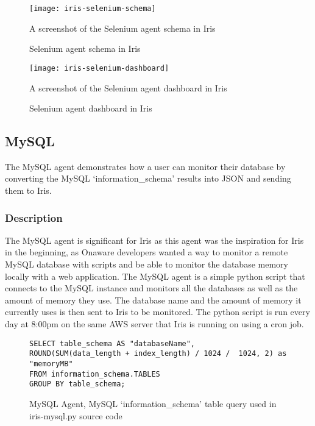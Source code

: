 \documentclass[12pt,a4paper,titlepage]{report}
\begin{document}
\begin{figure}[H]
\begin{tcolorbox}
\begin{center}
\texttt{[image: iris-selenium-schema]}
\end{center}
A screenshot of the Selenium agent schema in Iris
\end{tcolorbox}
\caption{Selenium agent schema in Iris}
\end{figure}

\begin{figure}[H]
\begin{tcolorbox}
\begin{center}
\texttt{[image: iris-selenium-dashboard]}
\end{center}
A screenshot of the Selenium agent dashboard in Iris
\end{tcolorbox}
\caption{Selenium agent dashboard in Iris}
\end{figure}

\subsection{MySQL}
The MySQL agent demonstrates how a user can monitor their database by converting the MySQL `information\_schema' results into JSON and sending them to Iris.
\subsubsection{Description}
The MySQL agent is significant for Iris as this agent was the inspiration for Iris in the beginning, as Onaware developers wanted a way to monitor a remote MySQL database with scripts and be able to monitor the database memory locally with a web application. The MySQL agent is a simple python script that connects to the MySQL instance and monitors all the databases as well as the amount of memory they use. The database name and the amount of memory it currently uses is then sent to Iris to be monitored. The python script is run every day at 8:00pm on the same AWS server that Iris is running on using a cron job.

\begin{figure}[H]
\begin{tcolorbox}
\begin{verbatim}
SELECT table_schema AS "databaseName", 
ROUND(SUM(data_length + index_length) / 1024 /  1024, 2) as "memoryMB" 
FROM information_schema.TABLES 
GROUP BY table_schema;
\end{verbatim}
\end{tcolorbox}
\caption{MySQL Agent, MySQL `information\_schema' table query used in iris-mysql.py source code}
\end{figure}
\end{document}
